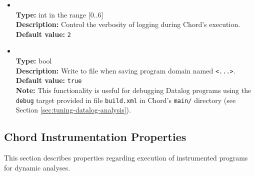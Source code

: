 \begin{itemize}
\item
{} \\
{\bf Type:} int in the range [0..6] \\
{\bf Description:} Control the verbosity of logging during Chord's execution. \\
{\bf Default value:} {\tt 2} 

\item
{} \\
{\bf Type:} bool \\
{\bf Description:} Write to file  when saving program domain named {\tt <...>}. \\
{\bf Default value:} {\tt true}  \\
{\bf Note:} This functionality is useful for debugging Datalog programs using the {\tt debug} target provided in file {\tt build.xml} in Chord's {\tt main/} directory (see Section \ref{sec:tuning-datalog-analysis}).
\end{itemize}

\subsection{Chord Instrumentation Properties}
\label{sec:instr-props}

This section describes properties regarding execution of instrumented programs for dynamic analyses.


